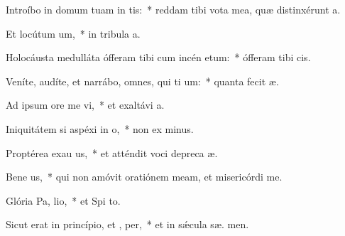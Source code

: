 \item Introíbo in domum tuam in tis:~* reddam tibi vota mea, quæ distinxérunt  a.
\item Et locútum   um,~* in tribula a.
\item Holocáusta medulláta ófferam tibi cum incén etum:~* ófferam tibi   cis.
\item Veníte, audíte, et narrábo, omnes, qui ti um:~* quanta fecit  æ.
\item Ad ipsum ore me vi,~* et exaltávi   a.
\item Iniquitátem si aspéxi in  o,~* non ex minus.
\item Proptérea exau us,~* et atténdit voci depreca æ.
\item Bene us,~* qui non amóvit oratiónem meam, et misericórdi   me.
\item Glória Pa,  lio,~* et Spi to.
\item Sicut erat in princípio, et ,  per,~* et in sǽcula sæ. men.

